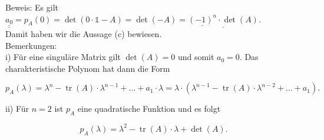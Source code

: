 \documentclass[10pt]{article}
\begin{document}
Beweis: Es gilt\\
$\underline{\underline{a_{0}}}=p_{A}(0)=\operatorname{det}(0 \cdot \mathbb{1}-A)=\operatorname{det}(-A)=\underline{\underline{(-1)^{n}} \cdot \operatorname{det}(A)}$.\\
Damit haben wir die Aussage (c) bewiesen.\\
Bemerkungen:\\
i) Für eine singuläre Matrix gilt $\operatorname{det}(A)=0$ und somit $a_{0}=0$. Das charakteristische Polynom hat dann die Form


\begin{equation*}
p_{A}(\lambda)=\lambda^{n}-\operatorname{tr}(A) \cdot \lambda^{n-1}+\ldots+a_{1} \cdot \lambda=\lambda \cdot\left(\lambda^{n-1}-\operatorname{tr}(A) \cdot \lambda^{n-2}+\ldots+a_{1}\right) . \tag{6.161}
\end{equation*}


ii) Für $n=2$ ist $p_{A}$ eine quadratische Funktion und es folgt


\begin{equation*}
p_{A}(\lambda)=\lambda^{2}-\operatorname{tr}(A) \cdot \lambda+\operatorname{det}(A) . \tag{6.162}
\end{equation*}
\end{document}
